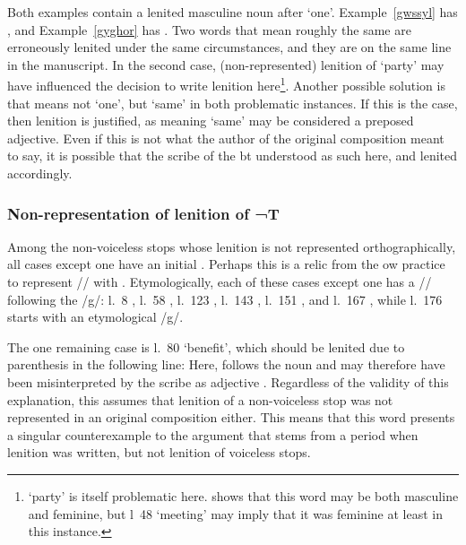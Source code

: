 Both examples contain a lenited masculine noun after  `one'. 
Example~\ref{gwssyl} has , and  Example~\ref{gyghor} has . 
Two words that mean roughly the same are erroneously lenited under the same circumstances, and they are on the same line in the manuscript. In the second case, (non-represented) lenition of  `party' may have influenced the decision to write lenition here\footnote{ `party' is itself problematic here. \Textcite[s.v.\ côr\textsuperscript{1}]{bevan_geiriadur_2014} shows that this word may be both masculine and feminine, but l~48 	`meeting' may imply that it was feminine at least in this instance.}. Another possible solution is that  means not `one', but `same' in both problematic instances. If this is the case, then lenition is justified, as  meaning `same' may be considered a preposed adjective. Even if this is not what the author of the original composition meant to say, it is possible that the scribe of the \gls{bt} understood  as such here, and lenited accordingly.



\subsubsection{Non-representation of lenition of ¬\acrshort{T}}
Among the non-voiceless stops whose lenition is not represented orthographically, all cases except one have an initial . Perhaps this is a relic from the \gls{ow} practice to represent /\cw/ with . Etymologically, each of these cases except one has a /\cw/ following the /g/: l.~8	,
l.~58	,
l.~123	,
l.~143	,
l.~151	, and
l.~167	, while
l.~176	 starts with an etymological /g/. 

The one remaining case is l.~80	 `benefit', which should be lenited due to parenthesis in the following line: 
Here,  follows the noun  and may therefore have been misinterpreted by the scribe as adjective . 
Regardless of the validity of this explanation, this assumes that lenition of a non-voiceless stop was not represented in an original composition either. 
This means that this word presents a singular counterexample to the argument that  stems from a period when lenition was written, but not lenition of voiceless stops.



